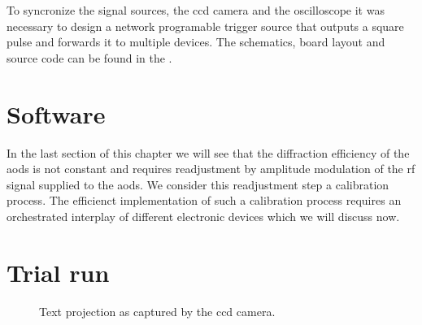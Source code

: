 To syncronize the signal sources, the \gls{ccd} camera and the oscilloscope
it was necessary to design a network programable trigger source that outputs
a square pulse and forwards it to multiple devices. The schematics, board
layout and source code can be found in the .

\section{Software}

In the last section of this chapter we will see that the diffraction
efficiency of the \gls{aod}s is not constant and requires readjustment by
amplitude modulation of the \gls{rf} signal supplied to the \gls{aod}s. We
consider this readjustment step a calibration process. The efficienct
implementation of such a calibration process requires an orchestrated
interplay of different electronic devices which we will discuss now.

\section{Trial run}

\begin{figure}[htb]
  \centering
  \begin{adjustbox}{width=\textwidth}
  \end{adjustbox}
  \caption{Text projection as captured by the \gls{ccd} camera.
  }\label{fig:setup_projection}
\end{figure}
